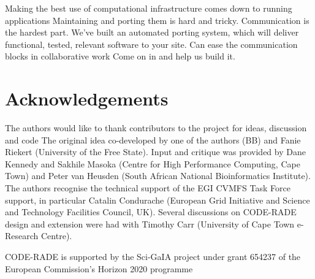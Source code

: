\documentclass[a4paper]{jpconf}
\begin{document}
Making the best use of computational infrastructure comes down to running applications
Maintaining and porting them is hard and tricky. Communication is the hardest part.
We've built an automated porting system, which will deliver functional, tested, relevant software to your site. Can ease the communication blocks in collaborative work
Come on in and help us build it.

\section*{Acknowledgements}
The authors would like to thank contributors to the project for ideas, discussion and code
The original idea co-developed by one of the authors (BB) and Fanie Riekert (University of the Free State). Input and critique was provided  by Dane Kennedy and Sakhile Masoka (Centre for High Performance Computing, Cape Town) and Peter van Heusden (South African National Bioinformatics Institute). The authors recognise the technical support of the EGI CVMFS Task Force support, in particular Catalin Condurache (European Grid Initiative and Science and Technology Facilities Council, UK). Several discussions on CODE-RADE design and extension were had with Timothy Carr (University of Cape Town e-Research Centre).

CODE-RADE is supported by the Sci-GaIA project under grant 654237 of the European Commission's Horizon 2020 programme
\end{document}
